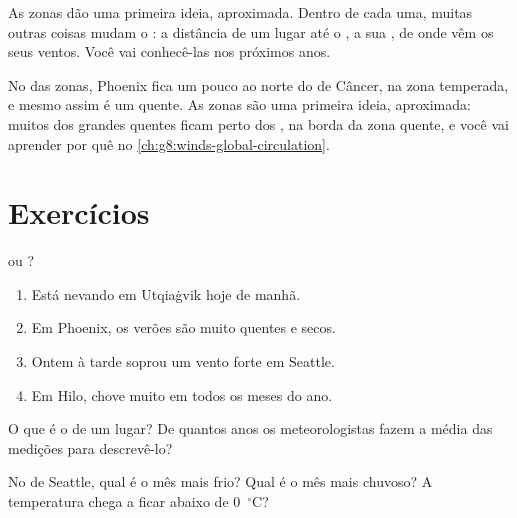 As zonas dão uma primeira ideia, aproximada. Dentro de cada uma, muitas
outras coisas mudam o : a distância de um lugar até o , a sua
, de onde vêm os seus ventos. Você vai conhecê-las nos próximos
anos.

\begin{remark}\label{rem:g5:weather-and-climate:phoenix}
No  das zonas, Phoenix fica um pouco ao norte do  de Câncer, na
zona temperada, e mesmo assim é um  quente. As zonas são uma
primeira ideia, aproximada: muitos dos grandes  quentes ficam perto
dos , na borda da zona quente, e você vai aprender por quê no
\cref{ch:g8:winds-global-circulation}.
\end{remark}

\section{Exercícios}

\begin{exercise}[$\star$]\label{exo:g5:weather-and-climate:1}
 ou ?
\begin{enumerate}
  \item[(a)] Está nevando em Utqiaġvik hoje de manhã.
  \item[(b)] Em Phoenix, os verões são muito quentes e secos.
  \item[(c)] Ontem à tarde soprou um vento forte em Seattle.
  \item[(d)] Em Hilo, chove muito em todos os meses do ano.
\end{enumerate}
\end{exercise}

\begin{exercise}[$\star$]\label{exo:g5:weather-and-climate:2}
O que é o  de um lugar? De quantos anos os meteorologistas fazem a
média das medições para descrevê-lo?
\end{exercise}

\begin{exercise}[$\star$]\label{exo:g5:weather-and-climate:3}
No  de Seattle, qual é o mês mais frio? Qual é o mês mais
chuvoso? A temperatura chega a ficar abaixo de 0~$^\circ$C?
\end{exercise}

